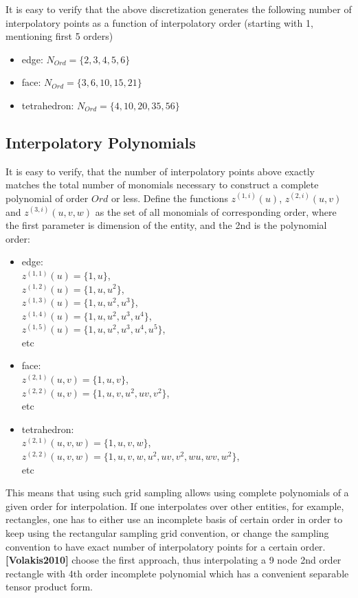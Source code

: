 \noindent
It is easy to verify that the above discretization generates the following number of interpolatory points as a function of interpolatory order (starting with 1, mentioning first 5 orders)
\begin{itemize}
	\item edge:			$N_{Ord} = \{ 2,3,4,5,6 \}  $
	\item face:			$N_{Ord} = \{ 3,6,10,15,21 \}  $
	\item tetrahedron:	$N_{Ord} = \{ 4,10,20,35,56 \}  $
\end{itemize}

\subsection{Interpolatory Polynomials}
\label{section-interppoly}

\noindent
It is easy to verify, that the number of interpolatory points above exactly matches the total number of monomials necessary to construct a complete polynomial of order $Ord$ or less. Define the functions $z^{(1,i)}(u)$, $z^{(2,i)}(u,v)$ and $z^{(3,i)}(u,v,w)$ as the set of all monomials of corresponding order, where the first parameter is dimension of the entity, and the 2nd is the polynomial order:
\begin{itemize}
	\item edge: \\
		$z^{(1,1)}(u) = \{1, u\}$, \\
		$z^{(1,2)}(u) = \{1, u, u^2\}$, \\
		$z^{(1,3)}(u) = \{1, u, u^2, u^3\}$, \\
		$z^{(1,4)}(u) = \{1, u, u^2, u^3, u^4\}$, \\
		$z^{(1,5)}(u) = \{1, u, u^2, u^3, u^4, u^5\}$, \\
		etc
	\item face:	\\
		$z^{(2,1)}(u,v)	= \{1, u, v\}$, \\
		$z^{(2,2)}(u,v) = \{1, u, v, u^2, uv, v^2\}$, \\
		etc
	\item tetrahedron: \\
		$z^{(2,1)}(u,v,w) = \{1, u, v, w\}$, \\ 
		$z^{(2,2)}(u,v,w) = \{1, u, v, w, u^2, uv, v^2, wu, wv, w^2\}$, \\
		etc
\end{itemize}

\noindent
This means that using such grid sampling allows using complete polynomials of a given order for interpolation. If one interpolates over other entities, for example, rectangles, one has to either use an incomplete basis of certain order in order to keep using the rectangular sampling grid convention, or change the sampling convention to have exact number of interpolatory points for a certain order. \textbf{[Volakis2010]} choose the first approach, thus interpolating a 9 node 2nd order rectangle with 4th order incomplete polynomial which has a convenient separable tensor product form. \\

